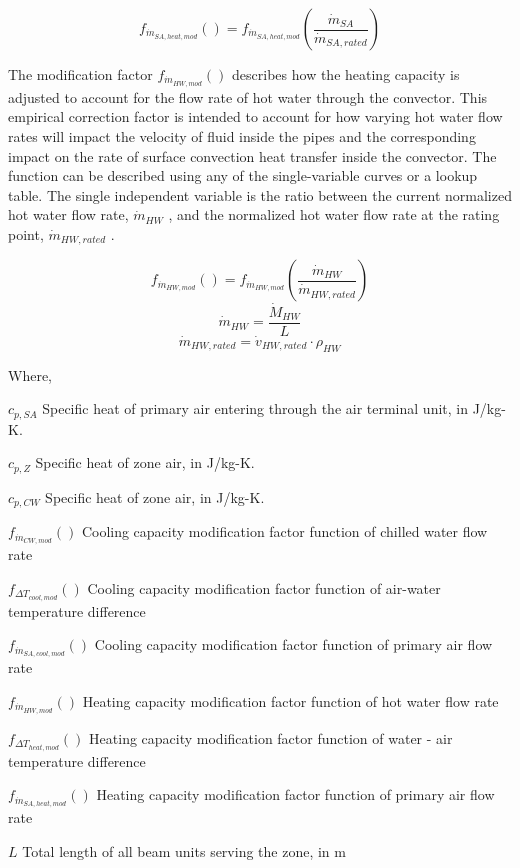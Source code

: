 \begin{equation}
{f_{\dot m_{SA,heat,mod}}()} = f_{\dot m_{SA,heat,mod}}\left(\frac{{\dot m_{SA}}}{{\dot m_{SA,rated}} }\right)
\end{equation}

The modification factor \(f_{\dot m_{HW,mod}}()\) describes how the heating capacity is adjusted to account for the flow rate of hot water through the convector. This empirical correction factor is intended to account for how varying hot water flow rates will impact the velocity of fluid inside the pipes and the corresponding impact on the rate of surface convection heat transfer inside the convector. The function can be described using any of the single-variable curves or a lookup table. The single independent variable is the ratio between the current normalized hot water flow rate, \({\dot m_{HW}}\) , and the normalized hot water flow rate at the rating point, \({\dot m_{HW,rated}}\) .

\[f_{\dot m_{HW,mod}}() = f_{\dot m_{HW,mod}}\left(\frac{{\dot m_{HW}}}{{\dot m_{HW,rated}}}\right)\] \[{\dot m_{HW}} = \frac{\dot M_{HW}}{L}\] \[{\dot m_{HW,rated}} = {\dot v_{HW,rated}} \cdot {\rho_{HW}}\]

Where,

\({c_{p,SA}}\) Specific heat of primary air entering through the air terminal unit, in J/kg-K.

\({c_{p,Z}}\) Specific heat of zone air, in J/kg-K.

\({c_{p,CW}}\) Specific heat of zone air, in J/kg-K.

\({f_{\dot m_{CW,mod}}()}\) Cooling capacity modification factor function of chilled water flow rate

\({f_{ \Delta T_{cool,mod} }()}\) Cooling capacity modification factor function of air-water temperature difference

\({f_{\dot m_{SA,cool,mod}}()}\) Cooling capacity modification factor function of primary air flow rate

\({f_{\dot m_{HW,mod}}()}\) Heating capacity modification factor function of hot water flow rate

\({f_{ \Delta T_{heat,mod} }()}\) Heating capacity modification factor function of water - air temperature difference

\({f_{\dot m_{SA,heat,mod}}()}\) Heating capacity modification factor function of primary air flow rate

\({L}\) Total length of all beam units serving the zone, in m

